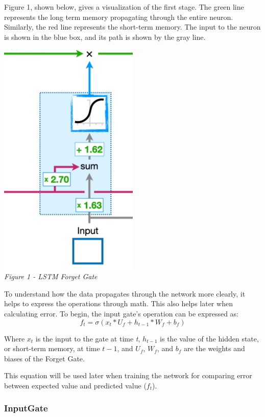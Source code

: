 \documentclass[12pt]{article}
\begin{document}
Figure 1, shown below, gives a visualization of the first stage. The green line
represents the long term memory propagating through the entire neuron.
Similarly, the red line represents the short-term memory. The input to the
neuron is shown in the blue box, and its path is shown by the gray line.

\begin{center}
    \includegraphics[width=0.5\textwidth]{ForgetGate.png}\\
    \emph{Figure 1 - LSTM Forget Gate}
\end{center}
To understand how the data propagates through the network more clearly, it
helps to express the operations through math. This also helps later when
calculating error. To begin, the input gate's operation can be expressed as:
\begin{equation}
    \label{eqn:f_t}
    f_t = \sigma(x_t*U_f + h_{t-1}*W_f + b_f)
\end{equation}

Where $x_t$ is the input to the gate at time \emph{t}, $h_{t-1}$ is the value
of the hidden state, or short-term memory, at time $t - 1$, and $U_f$, $W_f$,
and $b_f$ are the weights and biases of the Forget Gate.

This equation will be used later when training the network for comparing error
between expected value and predicted value ($f_t$).

\subsubsection{InputGate}
\end{document}
